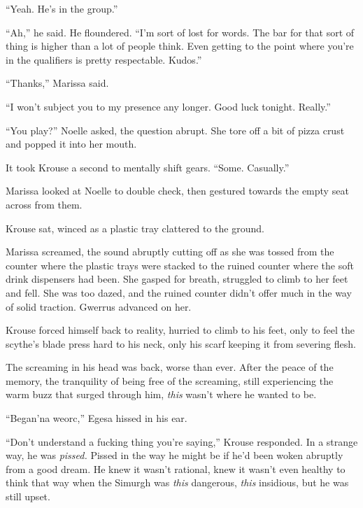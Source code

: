 ``Yeah.  He's in the group.''



``Ah,'' he said.  He floundered.  ``I'm sort of lost for words.  The bar for that sort of thing is higher than a lot of people think.  Even getting to the point where you're in the qualifiers is pretty respectable.  Kudos.''



``Thanks,'' Marissa said.



``I won't subject you to my presence any longer.  Good luck tonight.  Really.''



``You play?'' Noelle asked, the question abrupt.  She tore off a bit of pizza crust and popped it into her mouth.



It took Krouse a second to mentally shift gears.  ``Some.  Casually.''



Marissa looked at Noelle to double check, then gestured towards the empty seat across from them.



Krouse sat, winced as a plastic tray clattered to the ground.



Marissa screamed, the sound abruptly cutting off as she was tossed from the counter where the plastic trays were stacked to the ruined counter where the soft drink dispensers had been.  She gasped for breath, struggled to climb to her feet and fell.  She was too dazed, and the ruined counter didn't offer much in the way of solid traction.  Gwerrus advanced on her.



Krouse forced himself back to reality, hurried to climb to his feet, only to feel the scythe's blade press hard to his neck, only his scarf keeping it from severing flesh.



The screaming in his head was back, worse than ever.  After the peace of the memory, the tranquility of being free of the screaming, still experiencing the warm buzz that surged through him, \emph{this} wasn't where he wanted to be.



``Began'na weorc,'' Egesa hissed in his ear.



``Don't understand a fucking thing you're saying,'' Krouse responded.  In a strange way, he was \emph{pissed.  }Pissed in the way he might be if he'd been woken abruptly from a good dream.  He knew it wasn't rational, knew it wasn't even healthy to think that way when the Simurgh was \emph{this} dangerous, \emph{this }insidious, but he was still upset.



